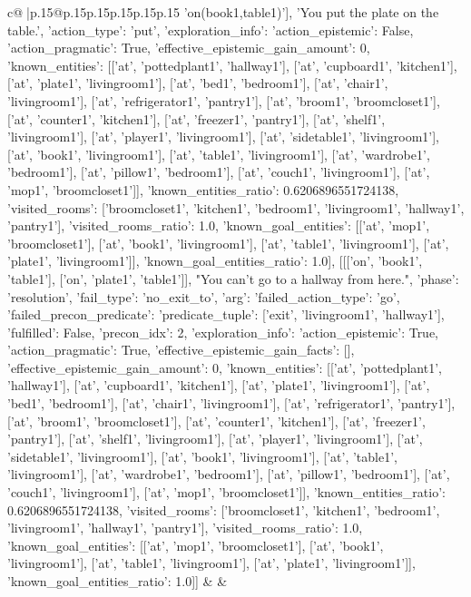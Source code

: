\documentclass{article}
\begin{document}
{\begin{supertabular}{c@{$\;$}|p{.15\linewidth}@{}p{.15\linewidth}p{.15\linewidth}p{.15\linewidth}p{.15\linewidth}p{.15\linewidth}}
{{{'on(book1,table1)'], 'You put the plate on the table.', {'action_type': 'put', 'exploration_info': {'action_epistemic': False, 'action_pragmatic': True, 'effective_epistemic_gain_amount': 0, 'known_entities': [['at', 'pottedplant1', 'hallway1'], ['at', 'cupboard1', 'kitchen1'], ['at', 'plate1', 'livingroom1'], ['at', 'bed1', 'bedroom1'], ['at', 'chair1', 'livingroom1'], ['at', 'refrigerator1', 'pantry1'], ['at', 'broom1', 'broomcloset1'], ['at', 'counter1', 'kitchen1'], ['at', 'freezer1', 'pantry1'], ['at', 'shelf1', 'livingroom1'], ['at', 'player1', 'livingroom1'], ['at', 'sidetable1', 'livingroom1'], ['at', 'book1', 'livingroom1'], ['at', 'table1', 'livingroom1'], ['at', 'wardrobe1', 'bedroom1'], ['at', 'pillow1', 'bedroom1'], ['at', 'couch1', 'livingroom1'], ['at', 'mop1', 'broomcloset1']], 'known_entities_ratio': 0.6206896551724138, 'visited_rooms': ['broomcloset1', 'kitchen1', 'bedroom1', 'livingroom1', 'hallway1', 'pantry1'], 'visited_rooms_ratio': 1.0, 'known_goal_entities': [['at', 'mop1', 'broomcloset1'], ['at', 'book1', 'livingroom1'], ['at', 'table1', 'livingroom1'], ['at', 'plate1', 'livingroom1']], 'known_goal_entities_ratio': 1.0}}], [[['on', 'book1', 'table1'], ['on', 'plate1', 'table1']], "You can't go to a hallway from here.", {'phase': 'resolution', 'fail_type': 'no_exit_to', 'arg': {'failed_action_type': 'go', 'failed_precon_predicate': {'predicate_tuple': ['exit', 'livingroom1', 'hallway1'], 'fulfilled': False, 'precon_idx': 2}}, 'exploration_info': {'action_epistemic': True, 'action_pragmatic': True, 'effective_epistemic_gain_facts': [], 'effective_epistemic_gain_amount': 0, 'known_entities': [['at', 'pottedplant1', 'hallway1'], ['at', 'cupboard1', 'kitchen1'], ['at', 'plate1', 'livingroom1'], ['at', 'bed1', 'bedroom1'], ['at', 'chair1', 'livingroom1'], ['at', 'refrigerator1', 'pantry1'], ['at', 'broom1', 'broomcloset1'], ['at', 'counter1', 'kitchen1'], ['at', 'freezer1', 'pantry1'], ['at', 'shelf1', 'livingroom1'], ['at', 'player1', 'livingroom1'], ['at', 'sidetable1', 'livingroom1'], ['at', 'book1', 'livingroom1'], ['at', 'table1', 'livingroom1'], ['at', 'wardrobe1', 'bedroom1'], ['at', 'pillow1', 'bedroom1'], ['at', 'couch1', 'livingroom1'], ['at', 'mop1', 'broomcloset1']], 'known_entities_ratio': 0.6206896551724138, 'visited_rooms': ['broomcloset1', 'kitchen1', 'bedroom1', 'livingroom1', 'hallway1', 'pantry1'], 'visited_rooms_ratio': 1.0, 'known_goal_entities': [['at', 'mop1', 'broomcloset1'], ['at', 'book1', 'livingroom1'], ['at', 'table1', 'livingroom1'], ['at', 'plate1', 'livingroom1']], 'known_goal_entities_ratio': 1.0}}]] 
	  } 
	   } 
	   } 
	 & & \\ 
 


\end{supertabular}}
\end{document}
